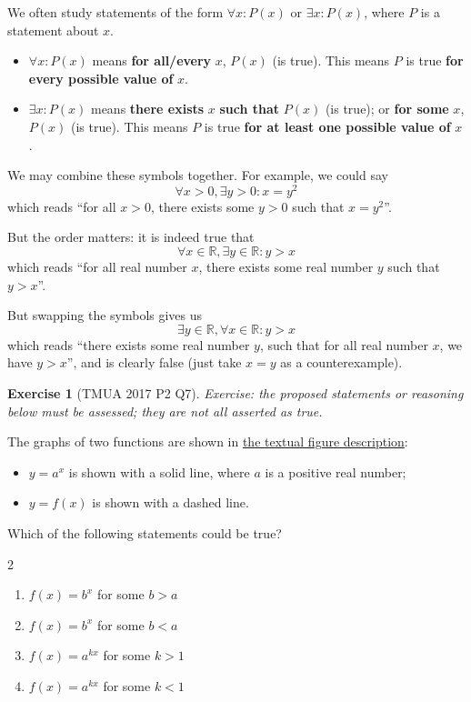 \documentclass[11pt]{article}
\theoremstyle{definition}
\newtheorem{example}[theorem]{Exercise}
\theoremstyle{remark}
\newcommand{\pqty}[1]{\left(#1\right)}
\newcommand{\RR}{\mathbb{R}}
\begin{document}
We often study statements of the form \(\forall x: P\pqty{x}\) or \(\exists x: P\pqty{x}\), where \(P\) is a statement about \(x\).

\begin{itemize}
    \item \(\forall x: P\pqty{x}\) means \textbf{for all/every} \(x\), \(P\pqty{x}\) (is true). This means \(P\) is true \textbf{for every possible value of} \(x\).
    \item \(\exists x: P\pqty{x}\) means \textbf{there exists} \(x\) \textbf{such that} \(P\pqty{x}\) (is true); or \textbf{for some} \(x\), \(P\pqty{x}\) (is true). This means \(P\) is true \textbf{for at least one possible value of} \(x\).
\end{itemize}

We may combine these symbols together. For example, we could say
\[
    \forall x > 0, \exists y > 0: x = y^2
\]
which reads ``for all \(x > 0\), there exists some \(y > 0\) such that \(x = y^2\)''.

But the order matters: it is indeed true that
\[
    \forall x \in \RR, \exists y \in \RR: y > x
\]
which reads ``for all real number \(x\), there exists some real number \(y\) such that \(y > x\)''.

But swapping the symbols gives us
\[
    \exists y \in \RR, \forall x \in \RR: y > x
\]
which reads ``there exists some real number \(y\), such that for all real number \(x\), we have \(y > x\)'', and is clearly false (just take \(x = y\) as a counterexample).

\begin{example}[TMUA 2017 P2 Q7]\label{tmua-6-unit-012}
\textit{Exercise: the proposed statements or reasoning below must be assessed; they are not all asserted as true.}\par

    The graphs of two functions are shown in \hyperref[fig:tmua-2017-p2-q7]{the textual figure description}:
    \begin{itemize}
        \item \(y = a^x\) is shown with a solid line, where \(a\) is a positive real number;
        \item \(y = f\pqty{x}\) is shown with a dashed line.
    \end{itemize}

    Which of the following statements could be true?

    \begin{multicols}{2}
        \begin{enumerate}[label=\Roman*.]
            \item \(f\pqty{x} = b^x\) for some \(b > a\)
            \item \(f\pqty{x} = b^x\) for some \(b < a\)
            \item \(f\pqty{x} = a^{kx}\) for some \(k > 1\)
            \item \(f\pqty{x} = a^{kx}\) for some \(k < 1\)
        \end{enumerate}
    \end{multicols}
\end{example}
\end{document}
